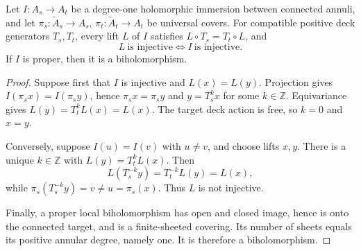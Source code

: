 \begin{theorem}\label{thm:tile-base-reduction}
Let \(I:A_s\to A_t\) be a degree-one holomorphic immersion between connected annuli, and let \(\pi_s:\tilde A_s\to A_s\), \(\pi_t:\tilde A_t\to A_t\) be universal covers. For compatible positive deck generators \(T_s,T_t\), every lift \(L\) of \(I\) satisfies \(L\circ T_s=T_t\circ L\), and
\[
L\ \text{is injective}\iff I\ \text{is injective}.
\]
If \(I\) is proper, then it is a biholomorphism.
\end{theorem}

\begin{proof}
Suppose first that \(I\) is injective and \(L(x)=L(y)\). Projection gives \(I(\pi_s x)=I(\pi_s y)\), hence \(\pi_s x=\pi_s y\) and \(y=T_s^{k}x\) for some \(k\in\mathbb Z\). Equivariance gives \(L(y)=T_t^{k}L(x)=L(x)\). The target deck action is free, so \(k=0\) and \(x=y\).

Conversely, suppose \(I(u)=I(v)\) with \(u\neq v\), and choose lifts \(x,y\). There is a unique \(k\in\mathbb Z\) with \(L(y)=T_t^{k}L(x)\). Then
\[
L(T_s^{-k}y)=T_t^{-k}L(y)=L(x),
\]
while \(\pi_s(T_s^{-k}y)=v\neq u=\pi_s(x)\). Thus \(L\) is not injective.

Finally, a proper local biholomorphism has open and closed image, hence is onto the connected target, and is a finite-sheeted covering. Its number of sheets equals its positive annular degree, namely one. It is therefore a biholomorphism.
\end{proof}